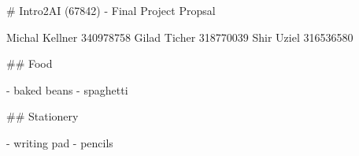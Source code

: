 \documentclass{article}
\begin{document}
\begin{markdown}
# Intro2AI (67842) - Final Project Propsal


Michal Kellner 340978758
Gilad Ticher 318770039
Shir Uziel 316536580

## Food

- baked beans
- spaghetti

## Stationery 

- writing pad
- pencils
\end{markdown}
\end{document}
